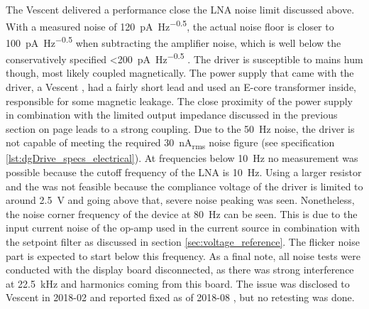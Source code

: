 The Vescent  delivered a performance close the LNA noise limit discussed above. With a measured noise of \qty{120}{\pA \per \Hz\tothe{0.5}}, the actual noise floor is closer to \qty{100}{\pA \per \Hz\tothe{0.5}} when subtracting the amplifier noise, which is well below the conservatively specified \qty{<200}{\pA \per \Hz\tothe{0.5}} \cite{datasheet_vescent_laser_driver}. The driver is susceptible to mains hum though, most likely coupled magnetically. The power supply that came with the driver, a Vescent , had a fairly short lead and used an E-core transformer inside, responsible for some magnetic leakage. The close proximity of the power supply in combination with the limited output impedance discussed in the previous section on page \pageref{fig:dgDrive_output_impedance_comparison} leads to a strong coupling. Due to the \qty{50}{\Hz} noise, the driver is not capable of meeting the required \qty{30}{\nA_{rms}} noise figure (see specification \ref{lst:dgDrive_specs_electrical}). At frequencies below \qty{10}{\Hz} no measurement was possible because the cutoff frequency of the LNA is \qty{10}{\Hz}. Using a larger resistor and the  was not feasible because the compliance voltage of the driver is limited to around \qty{2.5}{\V} and going above that, severe noise peaking was seen. Nonetheless, the noise corner frequency of the device at \qty{80}{\Hz} can be seen. This is due to the input current noise of the  op-amp used in the current source in combination with the setpoint filter as discussed in section \ref{sec:voltage_reference}. The flicker noise part is expected to start below this frequency. As a final note, all noise tests were conducted with the display board disconnected, as there was strong interference at \qty{22.5}{\kHz} and harmonics coming from this board. The issue was disclosed to Vescent in 2018-02 and reported fixed as of 2018-08 \cite{vescent_email}, but no retesting was done.

